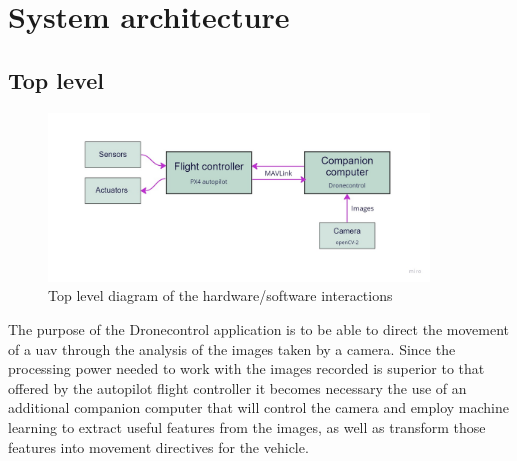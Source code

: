 \section{System architecture}
\label{sec:sysarch}

\subsection{Top level}

\begin{figure}
  \centering
  \includegraphics[width=0.9\textwidth,keepaspectratio]{img/sys-arch-diagram.jpg}
  \caption{Top level diagram of the hardware/software interactions}
  \label{fig:toplevel}
\end{figure}

The purpose of the Dronecontrol application is to be able to direct the movement of a \gls{uav} through the analysis of the images taken by a camera.
Since the processing power needed to work with the images recorded is superior to that offered by the autopilot flight controller it becomes necessary the use of an additional companion computer that will control the camera and employ machine learning to extract useful features from the images, as well as transform those features into movement directives for the vehicle.

